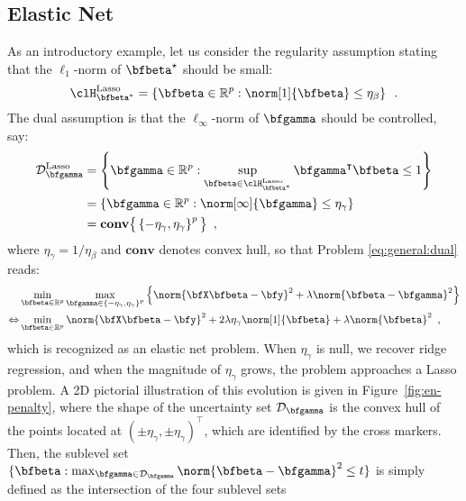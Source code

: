 \subsection{Elastic Net} \label{sec:elasticnet}

As an introductory example, let us consider the regularity assumption stating
that the $\ell_1$-norm of $\bfbeta^\star$ should be small:
%
\begin{equation*}
  \clH^\mathrm{Lasso}_{\bfbeta^*} = \left\{ \bfbeta \in \mathbb{R}^p : \norm[1]{\bfbeta} \leq \eta_\beta \right\}
  \enspace.
\end{equation*}
%
The dual assumption is that the $\ell_\infty$-norm of $\bfgamma$ should be
controlled, say:
%
\begin{align*}
  \mathcal{D}^\mathrm{Lasso}_{\bfgamma} & = \left\{ \bfgamma \in \mathbb{R}^p :
\sup_{\bfbeta\in\clH^\mathrm{Lasso}_{\bfbeta^*}} \bfgamma^\intercal\bfbeta \leq 1 \right\} \\
    & = \left\{ \bfgamma \in \mathbb{R}^p : \norm[\infty]{\bfgamma} \leq \eta_\gamma \right\} \\
    & = \mathbf{conv} \big\{ \left\{ -\eta_\gamma, \eta_\gamma \right\}^p \big\}
  \enspace,
\end{align*}
where $\eta_\gamma=1/\eta_\beta$ and $\mathbf{conv}$ denotes convex hull, so that Problem
\eqref{eq:general:dual} reads:
%
\begin{align}
  & \min_{\bfbeta\in\mathbb{R}^p} \max_{\bfgamma \in \left\{ -\eta_\gamma, \eta_\gamma \right\}^p}
      \Big\{ \norm{\bfX \bfbeta - \bfy}^2 + \lambda \norm{\bfbeta - \bfgamma}^2 
      \Big\} \nonumber \\
  \Leftrightarrow
    & \min_{\bfbeta\in\mathbb{R}^p}
      \norm{\bfX \bfbeta - \bfy}^2 + 2 \lambda \eta_\gamma \norm[1]{\bfbeta} + \lambda \norm{\bfbeta}^2 
  \enspace, \label{eq:elastic-net}
\end{align}
%
which is recognized as an elastic net problem.
When $\eta_\gamma$ is null, we recover ridge regression, and when the magnitude
of $\eta_\gamma$ grows, the problem approaches a Lasso problem. 
A 2D pictorial illustration of this evolution is given in
Figure~\ref{fig:en-penalty}, where the shape of the uncertainty set
$\mathcal{D}_{\bfgamma}$ is the convex hull of the points located at $(\pm
\eta_\gamma, \pm \eta_\gamma)^\intercal$, which are identified by the cross markers.
Then, the sublevel set 
$\{\bfbeta : \max_{\bfgamma \in \mathcal{D}_{\bfgamma}} \norm{\bfbeta-\bfgamma}^2 \leq t\}$
is simply defined as the intersection of the four sublevel sets
